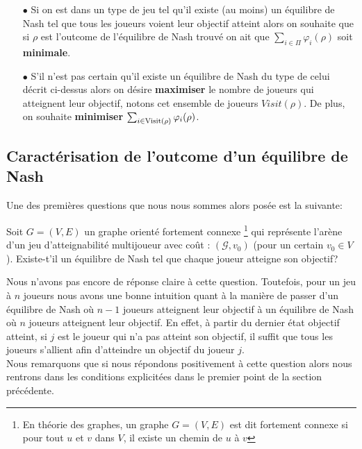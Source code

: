 \begin{itemize}
	\item[$\bullet$] Si on est dans un type de jeu tel qu'il existe (au moins) un équilibre de Nash tel que tous les joueurs voient leur objectif atteint alors on souhaite que si $\rho$ est l'outcome de l'équilibre de Nash trouvé on ait que
	$ \sum_{i \in \Pi} \varphi_i(\rho)$ soit \textbf{minimale}.
	\item[$\bullet$]S'il n'est pas certain qu'il existe un équilibre de Nash du type de celui décrit ci-dessus alors on désire \textbf{maximiser} le nombre de joueurs qui atteignent leur objectif, notons cet ensemble de joueurs $Visit(\rho)$. De plus, on souhaite \textbf{minimiser} $\sum_{i \in \operatorname*{Visit}(\rho)} \varphi_i(\rho)$.
\end{itemize}

\subsection{Caractérisation de l'outcome d'un équilibre de Nash}

Une des premières questions que nous nous sommes alors posée est la suivante:
\begin{qst}
	\label{qst:1}
	
	Soit $G = (V,E)$ un graphe orienté fortement connexe \footnote{En théorie des graphes, un graphe $G = (V,E)$ est dit fortement connexe si pour tout $u$ et $v$ dans $V$, il existe un chemin de $u$ à $v$} qui représente l'arène d'un jeu d'atteignabilité multijoueur avec coût : $(\mathcal{G},v_{0})$ (pour un certain $v_{0} \in V$).
Existe-t'il un équilibre de Nash tel que chaque joueur atteigne son objectif?

\end{qst}

Nous n'avons pas encore de réponse claire à cette question. Toutefois, pour un jeu à $n$ joueurs nous avons une bonne intuition quant à la manière de passer d'un équilibre de Nash où $n-1$ joueurs atteignent leur objectif à un équilibre de Nash où $n$ joueurs atteignent leur objectif. En effet, à partir du dernier état objectif atteint, si $j$ est le joueur qui n'a pas atteint son objectif, il suffit que tous les joueurs s'allient afin d'atteindre un objectif du joueur $j$.\\

Nous remarquons que si nous répondons positivement à cette question alors nous rentrons dans les conditions explicitées dans le premier point de la section précédente.

